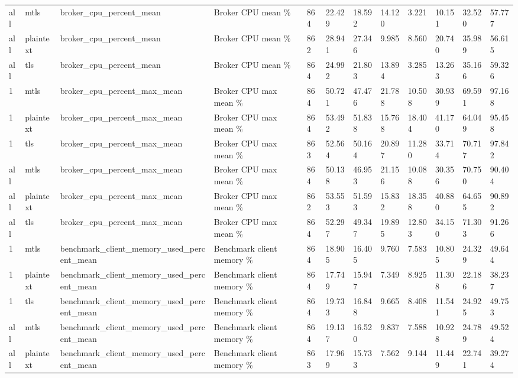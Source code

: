\begin{longtable}{llllllllllll}
all & mtls & broker\_cpu\_percent\_mean & Broker CPU mean \% & 864 & 22.429 & 18.592 & 14.120 & 3.221 & 10.151 & 32.520 & 57.777 \\
all & plaintext & broker\_cpu\_percent\_mean & Broker CPU mean \% & 862 & 28.941 & 27.346 & 9.985 & 8.560 & 20.740 & 35.989 & 56.615 \\
all & tls & broker\_cpu\_percent\_mean & Broker CPU mean \% & 864 & 24.992 & 21.803 & 13.894 & 3.285 & 13.263 & 35.166 & 59.326 \\
1 & mtls & broker\_cpu\_percent\_max\_mean & Broker CPU max mean \% & 864 & 50.721 & 47.476 & 21.788 & 10.508 & 30.939 & 69.591 & 97.168 \\
1 & plaintext & broker\_cpu\_percent\_max\_mean & Broker CPU max mean \% & 864 & 53.492 & 51.838 & 15.768 & 18.404 & 41.170 & 64.049 & 95.458 \\
1 & tls & broker\_cpu\_percent\_max\_mean & Broker CPU max mean \% & 863 & 52.564 & 50.164 & 20.897 & 11.280 & 33.714 & 70.717 & 97.842 \\
all & mtls & broker\_cpu\_percent\_max\_mean & Broker CPU max mean \% & 864 & 50.138 & 46.953 & 21.156 & 10.088 & 30.356 & 70.750 & 90.404 \\
all & plaintext & broker\_cpu\_percent\_max\_mean & Broker CPU max mean \% & 862 & 53.553 & 51.593 & 15.832 & 18.358 & 40.880 & 64.655 & 90.892 \\
all & tls & broker\_cpu\_percent\_max\_mean & Broker CPU max mean \% & 864 & 52.297 & 49.347 & 19.895 & 12.803 & 34.150 & 71.303 & 91.266 \\
1 & mtls & benchmark\_client\_memory\_used\_percent\_mean & Benchmark client memory \% & 864 & 18.905 & 16.405 & 9.760 & 7.583 & 10.805 & 24.329 & 49.644 \\
1 & plaintext & benchmark\_client\_memory\_used\_percent\_mean & Benchmark client memory \% & 864 & 17.749 & 15.947 & 7.349 & 8.925 & 11.308 & 22.186 & 38.237 \\
1 & tls & benchmark\_client\_memory\_used\_percent\_mean & Benchmark client memory \% & 864 & 19.733 & 16.848 & 9.665 & 8.408 & 11.541 & 24.925 & 49.753 \\
all & mtls & benchmark\_client\_memory\_used\_percent\_mean & Benchmark client memory \% & 864 & 19.137 & 16.520 & 9.837 & 7.588 & 10.928 & 24.789 & 49.524 \\
all & plaintext & benchmark\_client\_memory\_used\_percent\_mean & Benchmark client memory \% & 863 & 17.969 & 15.733 & 7.562 & 9.144 & 11.449 & 22.741 & 39.274 \\

\end{longtable}
